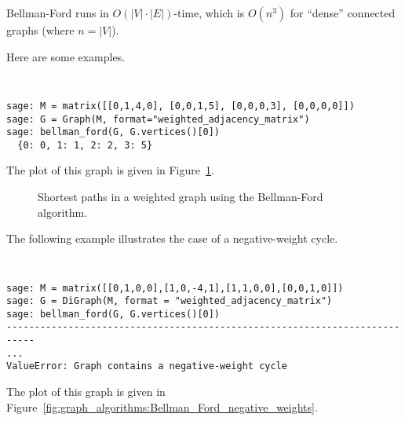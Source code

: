 Bellman-Ford runs in $O(|V|\cdot |E|)$-time, which is $O(n^3)$ for
``dense'' connected graphs (where $n=|V|$).

Here are some examples.

\begin{center}
\fontsize{9pt}{9pt}
\selectfont
\tt
\begin{lstlisting}
sage: M = matrix([[0,1,4,0], [0,0,1,5], [0,0,0,3], [0,0,0,0]])
sage: G = Graph(M, format="weighted_adjacency_matrix")
sage: bellman_ford(G, G.vertices()[0])
  {0: 0, 1: 1, 2: 2, 3: 5}
\end{lstlisting}
\end{center}
%
The plot of this graph is given in
Figure~\ref{fig:graph_algorithms:Bellman_Ford_example}.

\begin{figure}[!htbp]
\centering
{}
\caption{Shortest paths in a weighted graph using the Bellman-Ford
  algorithm.}
\label{fig:graph_algorithms:Bellman_Ford_example}
\end{figure}

The following example illustrates the case of a negative-weight cycle.

\begin{center}
\fontsize{9pt}{9pt}
\selectfont
\tt
\begin{lstlisting}
sage: M = matrix([[0,1,0,0],[1,0,-4,1],[1,1,0,0],[0,0,1,0]])
sage: G = DiGraph(M, format = "weighted_adjacency_matrix")
sage: bellman_ford(G, G.vertices()[0])
---------------------------------------------------------------------------
...
ValueError: Graph contains a negative-weight cycle
\end{lstlisting}
\end{center}
%
The plot of this graph is given in
Figure~\ref{fig:graph_algorithms:Bellman_Ford_negative_weights}.

